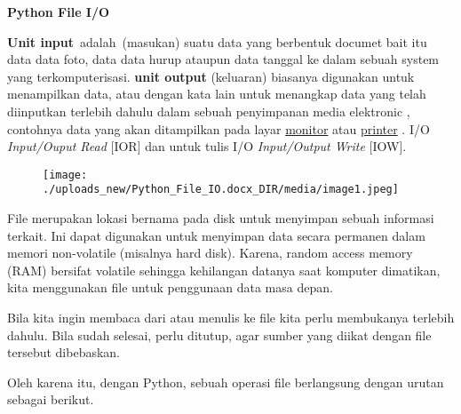
\begin{center}{\fontsize{24pt}{24pt}\selectfont \textbf{Python File I/O} \\}\end{center}
\textbf{Unit input}~adalah~(masukan) suatu  data yang berbentuk documet bait itu data data foto, data data hurup ataupun data tanggal ke dalam sebuah system yang  terkomputerisasi. 
\textbf{unit output} (keluaran) biasanya digunakan untuk menampilkan data, atau dengan kata lain untuk menangkap data yang telah diinputkan terlebih dahulu dalam sebuah penyimpanan media elektronic , contohnya data yang akan ditampilkan pada layar \href{https://id.wikipedia.org/wiki/Monitor}{monitor}
 atau \href{https://id.wikipedia.org/wiki/Printer}{printer}
.
I/O \textit{Input/Ouput Read} [IOR] dan untuk tulis I/O \textit{Input/Output Write} [IOW].




\begin{figure}[H]
\begin{center}
\texttt{[image: ./uploads\_new/Python\_File\_IO.docx\_DIR/media/image1.jpeg]}
\end{center}
\end{figure}




\vspace{12pt}
\vspace{12pt}
\vspace{14pt}
\noindent 
File merupakan lokasi bernama pada disk untuk menyimpan sebuah informasi terkait. Ini dapat digunakan untuk menyimpan data secara permanen dalam memori non-volatile (misalnya hard disk). 
\vspace{12pt}
\noindent 
Karena, random access memory (RAM) bersifat volatile sehingga kehilangan datanya saat komputer dimatikan, kita menggunakan file untuk penggunaan data masa depan.

Bila kita ingin membaca dari atau menulis ke file kita perlu membukanya terlebih dahulu. Bila sudah selesai, perlu ditutup, agar sumber yang diikat dengan file tersebut dibebaskan. 


Oleh karena itu, dengan Python, sebuah operasi file berlangsung dengan urutan sebagai berikut. 

